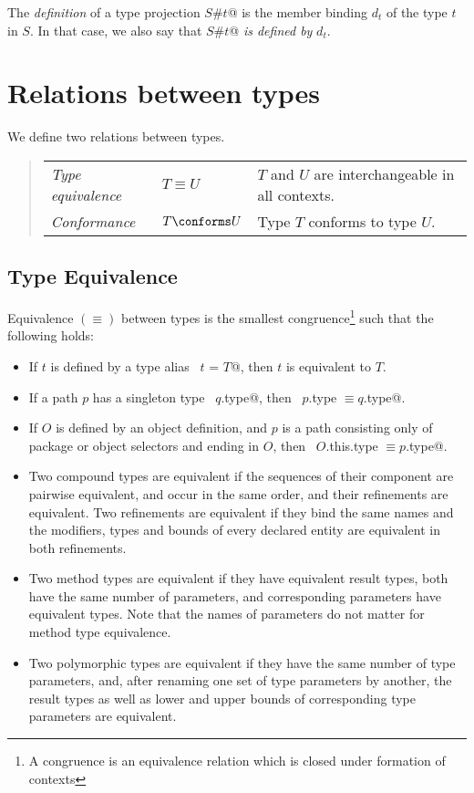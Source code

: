 The {\em definition} of a type projection \lstinline@$S$#$t$@ is the member
binding $d_t$ of the type $t$ in $S$. In that case, we also say
that \lstinline@$S$#$t$@ {\em is defined by} $d_t$.

\section{Relations between types}

We define two relations between types.
\begin{quote}\begin{tabular}{l@{\gap}l@{\gap}l}
\em Type equivalence & $T \equiv U$ & $T$ and $U$ are interchangeable
in all contexts.
\\
\em Conformance & $T \conforms U$ & Type $T$ conforms to type $U$.
\end{tabular}\end{quote}

\subsection{Type Equivalence}
\label{sec:type-equiv}

Equivalence $(\equiv)$ between types is the smallest congruence\footnote{ A
congruence is an equivalence relation which is closed under formation
of contexts} such that the following holds:
\begin{itemize}
\item 
If $t$ is defined by a type alias ~\lstinline@type $t$ = $T$@, then $t$ is
equivalent to $T$.
\item
If a path $p$ has a singleton type ~\lstinline@$q$.type@, then
~\lstinline@$p$.type $\equiv q$.type@.
\item
If $O$ is defined by an object definition, and $p$ is a path
consisting only of package or object selectors and ending in $O$, then
~\lstinline@$O$.this.type $\equiv p$.type@.
\item
Two compound types are equivalent if the sequences of their component
are pairwise equivalent, and occur in the same order, and their
refinements are equivalent. Two refinements are equivalent if they
bind the same names and the modifiers, types and bounds of every
declared entity are equivalent in both refinements.
\item
Two method types are equivalent if they have equivalent result types,
both have the same number of parameters, and corresponding parameters
have equivalent types.  Note that the names of parameters do not
matter for method type equivalence.
\item
Two polymorphic types are equivalent if they have the same number of
type parameters, and, after renaming one set of type parameters by
another, the result types as well as lower and upper bounds of
corresponding type parameters are equivalent.
\end{itemize}


